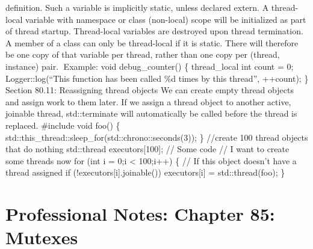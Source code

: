 deﬁnition. Such a variable is implicitly static, unless declared extern.
A thread-local variable with namespace or class (non-local) scope will
be initialized as part of thread startup. Thread-local variables are
destroyed upon thread termination. A member of a class can only be
thread-local if it is static. There will therefore be one copy of that
variable per thread, rather than one copy per (thread, instance) pair.
Example: void debug\_counter() \{ thread\_local int count = 0;
Logger::log(``This function has been called \%d times by this thread'',
++count); \} Section 80.11: Reassigning thread objects We can create
empty thread objects and assign work to them later. If we assign a
thread object to another active, joinable thread, std::terminate will
automatically be called before the thread is replaced. \#include void
foo() \{ std::this\_thread::sleep\_for(std::chrono::seconds(3)); \}
//create 100 thread objects that do nothing std::thread
executors{[}100{]}; // Some code // I want to create some threads now
for (int i = 0;i \textless{} 100;i++) \{ // If this object doesn't have
a thread assigned if (!executors{[}i{]}.joinable()) executors{[}i{]} =
std::thread(foo); \}

\hypertarget{professional-notes-chapter-85-mutexes-1}{%
\chapter{Professional Notes: Chapter 85:
Mutexes}\label{professional-notes-chapter-85-mutexes-1}}

